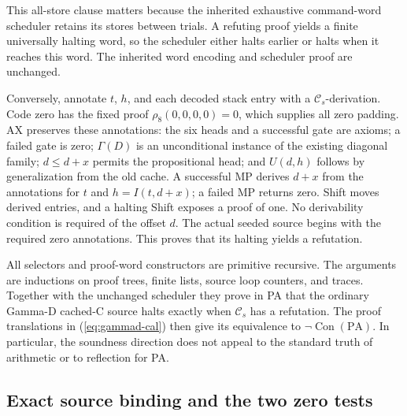 This all-store clause matters because the inherited exhaustive
command-word scheduler retains its stores between trials.  A refuting
proof yields a finite universally halting word, so the scheduler either
halts earlier or halts when it reaches this word.  The inherited
word encoding and scheduler proof are unchanged.

Conversely, annotate \(t\), \(h\), and each decoded stack entry
with a \(\mathcal C_s\)-derivation.  Code zero has the fixed proof
\(\rho_8(0,0,0,0)=0\), which supplies all zero padding.
AX preserves these annotations: the six heads and a successful gate
are axioms; a failed gate is zero; \(\Gamma(D)\) is an unconditional
instance of the existing diagonal family; \(d\le d+x\) permits
the propositional head; and \(U(d,h)\) follows by generalization
from the old cache.  A successful MP derives \(d+x\) from the
annotations for \(t\) and \(h=I(t,d+x)\); a failed MP returns
zero.  Shift moves derived entries, and a halting Shift exposes a
proof of one.  No derivability condition is required of the offset
\(d\).  The actual seeded source begins with the required zero
annotations.  This proves that its halting yields a refutation.

All selectors and proof-word constructors are primitive recursive.
The arguments are inductions on proof trees, finite lists, source loop
counters, and traces.  Together with the unchanged scheduler they prove
in PA that the ordinary Gamma-D cached-C source halts exactly when
\(\mathcal C_s\) has a refutation.  The proof translations in
(\ref{eq:gammad-cal}) then give its equivalence to
\(\neg\operatorname{Con}(\mathrm{PA})\).  In particular, the
soundness direction does not appeal to the standard truth of arithmetic
or to reflection for PA.

\subsection{Exact source binding and the two zero tests}

